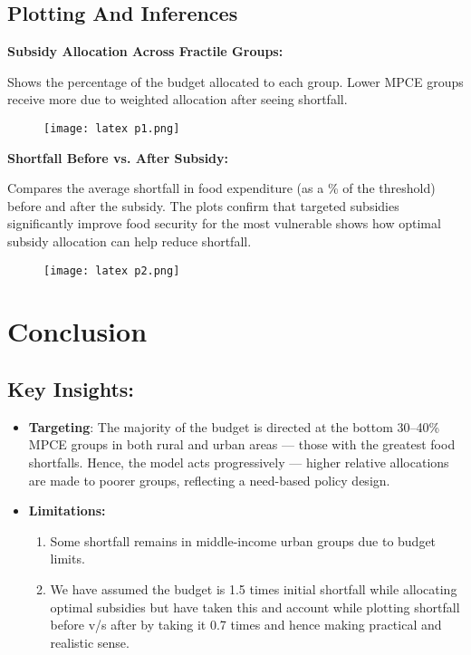 \documentclass[12pt]{article}
\begin{document}
\subsection{Plotting And Inferences}
\textbf{Subsidy Allocation Across Fractile Groups:}

Shows the percentage of the budget allocated to each group. Lower MPCE groups receive more due to weighted allocation after seeing shortfall.

\begin{figure}[h]
    \centering
    \texttt{[image: latex p1.png]}
    \caption{}
    \label{fig:subsidy_allocation}
\end{figure}

\vspace{2cm} %
\clearpage
\textbf{Shortfall Before vs. After Subsidy:}

Compares the average shortfall in food expenditure (as a \% of the threshold) before and after the subsidy. The plots confirm that targeted subsidies significantly improve food security for the most vulnerable shows how optimal subsidy allocation can help reduce shortfall.

\begin{figure}[h]
    \centering
    \texttt{[image: latex p2.png]}
    \caption{}
    \label{fig:shortfall_comparison}
\end{figure}

\vspace{2cm} %


\section{Conclusion}
\subsection{Key Insights:}
\begin{itemize}
    \item \textbf{Targeting}: The majority of the budget is directed at the bottom 30–40\% MPCE groups in both rural and urban areas — those with the greatest food shortfalls. Hence, the model acts progressively — higher relative allocations are made to poorer groups, reflecting a need-based policy design.
    \item \textbf{Limitations:}
    \begin{enumerate}
        \item Some shortfall remains in middle-income urban groups due to budget limits.
        \item We have assumed the budget is 1.5 times initial shortfall while allocating optimal subsidies but have taken this and account while plotting shortfall before v/s after by taking it 0.7 times and hence making practical and realistic sense.
    \end{enumerate}
\end{itemize}
\end{document}

